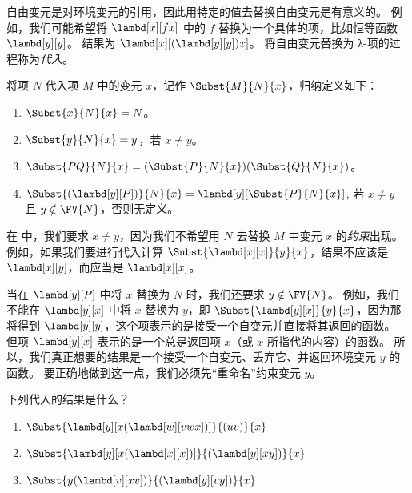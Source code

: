 \documentclass[../../../include/open-logic-section]{subfiles}
\begin{document}

\begin{explain}
自由变元是对环境变元的引用，因此用特定的值去替换自由变元是有意义的。
例如，我们可能希望将 $\lambd[x][f x]$ 中的 $f$ 替换为一个具体的项，比如恒等函数 $\lambd[y][y]$。
结果为 $\lambd[x][(\lambd[y][y]) x]$。
将自由变元替换为 λ-项的过程称为\emph{代入}。
\end{explain}

\begin{defn}[代入]
  将项 $N$ 代入项 $M$ 中的变元 $x$，记作 $\Subst{M}{N}{x}$，归纳定义如下：
  \begin{enumerate}
    \item $\Subst{x}{N}{x} = N$。
    \item $\Subst{y}{N}{x}  = y$，若 $x \neq y$。
    \item $\Subst{PQ}{N}{x}  = (\Subst{P}{N}{x}) (\Subst{Q}{N}{x})$。
    \item $\Subst{(\lambd[y][P])}{N}{x} = \lambd[y][\Subst{P}{N}{x}]$,
          若 $x \neq y$ 且 $y \notin \FV{N}$，否则无定义。
  \end{enumerate}
\end{defn}

\begin{explain}
在  中，我们要求 $x \neq y$，因为我们不希望用 $N$ 去替换 $M$ 中变元 $x$ 的\emph{约束}出现。
例如，如果我们要进行代入计算 $\Subst{\lambd[x][x]}{y}{x}$，结果不应该是 $\lambd[x][y]$，而应当是 $\lambd[x][x]$。

当在 $\lambd[y][P]$ 中将 $x$ 替换为 $N$ 时，我们还要求 $y \notin \FV{N}$。
例如，我们不能在 $\lambd[y][x]$ 中将 $x$ 替换为 $y$，即 $\Subst{\lambd[y][x]}{y}{x}$，因为那将得到 $\lambd[y][y]$，这个项表示的是接受一个自变元并直接将其返回的函数。
但项 $\lambd[y][x]$ 表示的是一个总是返回项 $x$（或 $x$ 所指代的内容）的函数。
所以，我们真正想要的结果是一个接受一个自变元、丢弃它、并返回环境变元 $y$ 的函数。
要正确地做到这一点，我们必须先“重命名”约束变元 $y$。
\end{explain}

\begin{prob}
  下列代入的结果是什么？
  \begin{enumerate}
  \item $\Subst{\lambd[y][x(\lambd[w][vwx])]}{(uv)}{x}$
  \item $\Subst{\lambd[y][x(\lambd[x][x])]}{(\lambd[y][xy])}{x}$
  \item $\Subst{y(\lambd[v][xv])}{(\lambd[y][vy])}{x}$
  \end{enumerate}
\end{prob}
\end{document}
